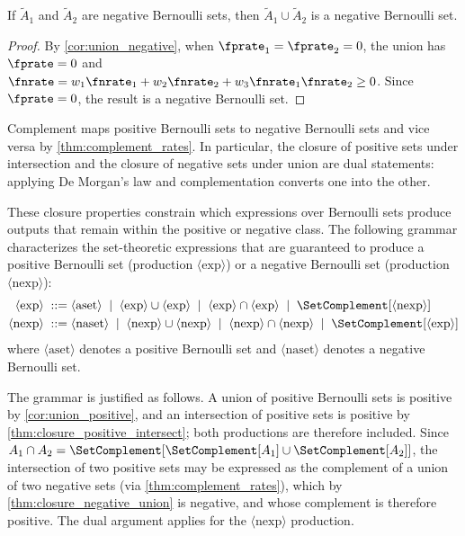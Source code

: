 \begin{theorem}
\label{thm:closure_negative_union}
If $\tilde{A}_1$ and $\tilde{A}_2$ are negative Bernoulli sets, then
$\tilde{A}_1 \cup \tilde{A}_2$ is a negative Bernoulli set.
\end{theorem}
\begin{proof}
By \cref{cor:union_negative}, when $\fprate_1 = \fprate_2 = 0$,
the union has $\fprate = 0$ and
$\fnrate = w_1 \fnrate_1 + w_2 \fnrate_2
+ w_3 \fnrate_1 \fnrate_2 \geq 0$.
Since $\fprate = 0$, the result is a negative Bernoulli set.
\end{proof}

\begin{remark}
Complement maps positive Bernoulli sets to negative Bernoulli sets and vice
versa by \cref{thm:complement_rates}.
In particular, the closure of positive sets under intersection and the
closure of negative sets under union are dual statements: applying
De Morgan's law and complementation converts one into the other.
\end{remark}

These closure properties constrain which expressions over Bernoulli sets
produce outputs that remain within the positive or negative class.
The following grammar characterizes the set-theoretic expressions that are
guaranteed to produce a positive Bernoulli set (production $\langle
\mathrm{exp} \rangle$) or a negative Bernoulli set (production $\langle
\mathrm{nexp} \rangle$):
\begin{align}
\label{eq:grammar_exp}
\langle \mathrm{exp} \rangle \; ::= \; &
    \langle \mathrm{aset} \rangle
    \;\mid\; \langle \mathrm{exp} \rangle \cup \langle \mathrm{exp} \rangle
    \;\mid\; \langle \mathrm{exp} \rangle \cap \langle \mathrm{exp} \rangle
    \;\mid\; \SetComplement[\langle \mathrm{nexp} \rangle] \\
\label{eq:grammar_nexp}
\langle \mathrm{nexp} \rangle \; ::= \; &
    \langle \mathrm{naset} \rangle
    \;\mid\; \langle \mathrm{nexp} \rangle \cup \langle \mathrm{nexp}
        \rangle
    \;\mid\; \langle \mathrm{nexp} \rangle \cap \langle \mathrm{nexp}
        \rangle
    \;\mid\; \SetComplement[\langle \mathrm{exp} \rangle]
\end{align}
where $\langle \mathrm{aset} \rangle$ denotes a positive Bernoulli set and
$\langle \mathrm{naset} \rangle$ denotes a negative Bernoulli set.

The grammar is justified as follows.
A union of positive Bernoulli sets is positive by
\cref{cor:union_positive}, and an intersection of positive sets is positive
by \cref{thm:closure_positive_intersect}; both productions are therefore included.
Since $A_1 \cap A_2 = \SetComplement[\SetComplement[A_1] \cup
\SetComplement[A_2]]$, the intersection of two positive sets may be
expressed as the complement of a union of two negative sets (via
\cref{thm:complement_rates}), which by
\cref{thm:closure_negative_union} is negative, and whose complement is
therefore positive.
The dual argument applies for the $\langle \mathrm{nexp} \rangle$
production.

